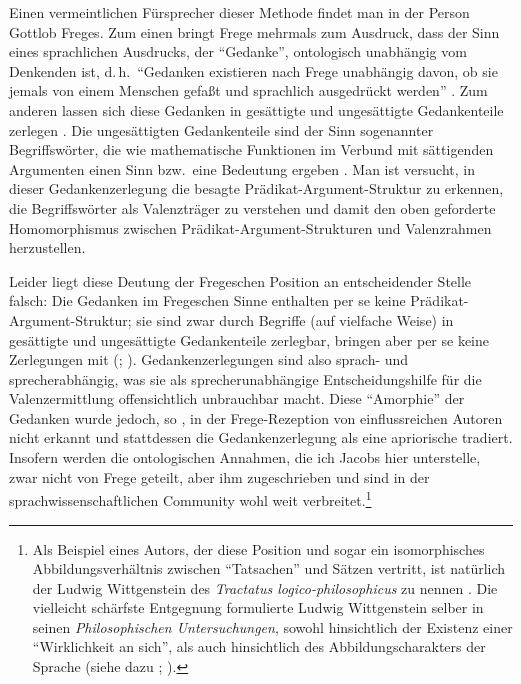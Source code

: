 Einen vermeintlichen Fürsprecher dieser Methode findet man in der Person Gottlob Freges. Zum einen bringt Frege mehrmals zum Ausdruck, dass der Sinn eines sprachlichen Ausdrucks, der "`Gedanke"', ontologisch unabhängig vom Denkenden ist, d.\,h.\ "`Gedanken existieren nach Frege unabhängig davon, ob sie jemals von einem Menschen gefa\ss t und sprachlich ausgedrückt werden"' \citep[492]{Schirn:92}. Zum anderen lassen sich diese Gedanken in gesättigte und ungesättigte Gedankenteile zerlegen \citep[491]{Schirn:92}. Die ungesättigten Gedankenteile sind der Sinn sogenannter Begriffswörter, die wie mathematische Funktionen im Verbund mit sättigenden Argumenten einen Sinn bzw.\ eine Bedeutung ergeben \citep[476f]{Schirn:92}. Man ist versucht, in dieser Gedankenzerlegung die besagte Prädikat-Argument-Struktur zu erkennen, die Begriffswörter als Valenzträger zu verstehen und damit den oben geforderte Homomorphismus zwischen Prädikat-Argument-Strukturen und Valenzrahmen herzustellen. 

Leider liegt diese Deutung der Fregeschen Position an entscheidender Stelle falsch: Die Gedanken im Fregeschen Sinne enthalten per se keine Prädikat-Argument-Struktur; sie sind zwar durch Begriffe (auf vielfache Weise) in gesättigte und ungesättigte Gedankenteile zerlegbar, bringen aber per se keine Zerlegungen mit (\citealt{Kemmerling:90,Kemmerling:10}; \citealt[492]{Schirn:92}). Gedankenzerlegungen sind also sprach- und sprecherabhängig, was sie als sprecherunabhängige Entscheidungshilfe für die Valenzermittlung offensichtlich unbrauchbar macht. Diese "`Amorphie"' der Gedanken wurde jedoch, so \cite{Kemmerling:90}, in der Frege-Rezeption von einflussreichen Autoren nicht erkannt und stattdessen die Gedankenzerlegung als eine apriorische tradiert. Insofern werden die ontologischen Annahmen, die ich Jacobs hier unterstelle, zwar nicht von Frege geteilt, aber ihm zugeschrieben und sind in der sprachwissenschaftlichen Community wohl weit verbreitet.\footnote{Als Beispiel eines Autors, der diese Position und sogar ein isomorphisches Abbildungsverhältnis zwischen "`Tatsachen"' und Sätzen vertritt, ist natürlich der Ludwig Wittgenstein des \textit{Tractatus logico-philosophicus} zu nennen \citep[53]{Kutschera:75}. Die vielleicht schärfste Entgegnung formulierte Ludwig Wittgenstein selber in seinen \textit{Philosophischen Untersuchungen}, sowohl hinsichtlich der Existenz einer "`Wirklichkeit an sich"', als auch hinsichtlich des Abbildungscharakters der Sprache (siehe dazu \citealt[133]{Kutschera:75}; \citealt[22]{Ortner:87}).}

